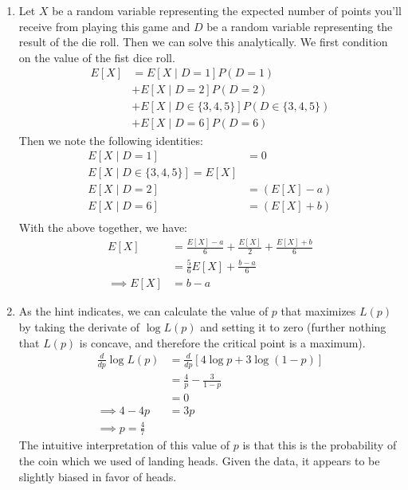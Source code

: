 \documentclass[12pt]{article}
\begin{document}
\begin{enumerate}[label=(\alph*)]
  \item Let $X$ be a random variable representing the expected number of points you'll receive from playing this game and $D$ be a random variable representing the result of the die roll. Then we can solve this analytically. We first condition on the value of the fist dice roll.
  \begin{align*}
    E[X] &= E[X \mid D = 1]P(D = 1) \\
    &+ E[X \mid D = 2]P(D = 2)\\
    &+ E[X \mid D \in \{3,4,5 \}]P(D \in \{3,4,5 \})\\
    &+E[X \mid D = 6]P(D = 6)
  \end{align*}
  Then we note the following identities:
  \begin{align*}
  E[X \mid D = 1] &= 0 \tag{we will receive no points} \\
  E[X \mid D \in \{3,4,5\}] = E[X] \tag{the game is memoryless, so we can ignore the roll} \\
  E[X \mid D = 2] &= (E[X] - a) \tag{the game is memoryless, and whatever points we expect to get, we'll lose $a$ of them} \\
  E[X \mid D = 6] &= (E[X] + b) \tag{similar reasoning to above, but we will also gain $b$ points} \\
  \end{align*}
  With the above together, we have:
  \begin{align*}
    E[X] &= \frac{E[X] - a}{6} + \frac{E[X]}{2} + \frac{E[X] + b}{6} \\
    &= \frac{5}{6}E[X] + \frac{b-a}{6} \\
    \implies E[X] &= b - a
  \end{align*}

  \item As the hint indicates, we can calculate the value of $p$ that maximizes $L(p)$ by taking the derivate of $\log L(p)$ and setting it to zero (further nothing that $L(p)$ is concave, and therefore the critical point is a maximum).
  \begin{align*}
    \frac{d}{dp}\log L(p) &= \frac{d}{dp}\left[4\log p + 3 \log (1-p)\right] \\
    &= \frac{4}{p} - \frac{3}{1-p} \\
    &= 0 \\
    \implies 4 - 4p &= 3p \\
    \implies p = \frac{4}{7} 
  \end{align*}
  The intuitive interpretation of this value of $p$ is that this is the probability of the coin which we used of landing heads. Given the data, it appears to be slightly biased in favor of heads.


\end{enumerate}
\end{document}
